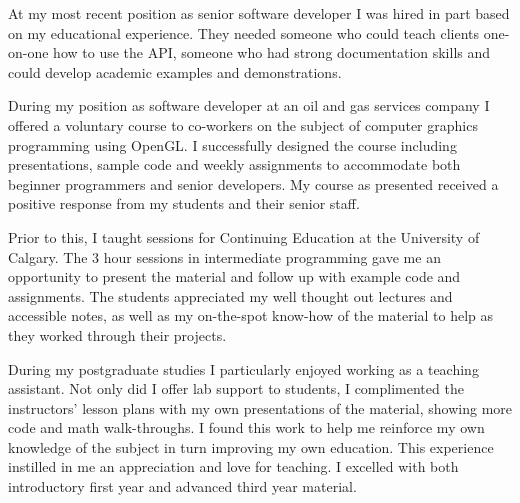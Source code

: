 \begin{minipage}[t]{\textwidth} %
	\vspace{-\baselineskip} %
\begin{entrylist}
	\entry
{}
{}
{}
{At my most recent position as senior software developer I was hired in part based on my educational experience. They needed someone who could teach clients one-on-one how to use the API, someone who had strong documentation skills and could develop academic examples and demonstrations. }
\end{entrylist}
\begin{entrylist}
	\entry
{}
{}
{}
{During my position as software developer at an oil and gas services company I
offered a voluntary course to co-workers on the subject of computer graphics programming
using OpenGL. I successfully designed the course including presentations, sample code and
weekly assignments to accommodate both beginner programmers and senior developers. My
course as presented received a positive response from my students and their senior staff.}
\end{entrylist}
\begin{entrylist}
	\entry
{}
{}
{}
{Prior to this, I taught sessions for Continuing Education at the University of Calgary. The 3 hour
sessions in intermediate programming gave me an opportunity to present the material and
follow up with example code and assignments. The students appreciated my well thought out
lectures and accessible notes, as well as my on-the-spot know-how of the material to help as
they worked through their projects.}
\end{entrylist}
\begin{entrylist}
	\entry
{}
{}
{}
{During my postgraduate studies I particularly enjoyed working as a teaching assistant. Not only
did I offer lab support to students, I complimented the instructors’ lesson plans with my own
presentations of the material, showing more code and math walk-throughs. I found this work to
help me reinforce my own knowledge of the subject in turn improving my own education. This
experience instilled in me an appreciation and love for teaching. I excelled with both introductory
first year and advanced third year material.}
\end{entrylist}
\end{minipage}